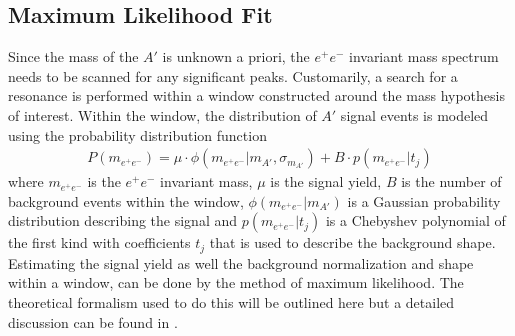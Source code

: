\subsection{Maximum Likelihood Fit}

Since the mass of the $A'$ is unknown a priori, the 
$e^+e^-$ invariant mass spectrum needs to be scanned for any significant peaks.
Customarily, a search for a resonance is performed within a
window constructed around the mass hypothesis of interest.  Within the window,
the distribution of $A'$ signal events is modeled using the probability 
distribution function
\begin{equation}
    \begin{split}
    P(m_{e^+e^-}) 
        = 
        \mu \cdot \phi(m_{e^+e^-} | m_{A'}, \sigma_{m_{A'}}) + B\cdot p(m_{e^+e^-} | t_j)
    \end{split}
\end{equation}
where $m_{e^+e^-}$ is the $e^+e^-$ invariant mass, $\mu$ is the signal yield,
$B$ is the number of background events within the window, 
$\phi(m_{e^+e^-} | m_{A'})$ is a Gaussian probability distribution describing
the signal and $p(m_{e^+e^-} | t_j)$ is a Chebyshev polynomial of the first kind
with coefficients $t_j$ that is used to describe the background shape.
Estimating the 
signal yield as well the background normalization and shape within a window, can be
done by the method of maximum likelihood.  The theoretical formalism
used to do this will be outlined here but a detailed discussion can be found in
\cite{Cowan:2010js}.

